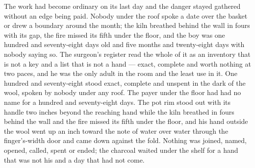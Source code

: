 The work had become ordinary on its last day and the danger stayed gathered without an edge being paid. Nobody under the roof spoke a date over the basket or drew a boundary around the month; the kiln breathed behind the wall in fours with its gap, the fire missed its fifth under the floor, and the boy was one hundred and seventy-eight days old and five months and twenty-eight days with nobody saying so. The surgeon's register read the whole of it as an inventory that is not a key and a list that is not a hand --- exact, complete and worth nothing at two paces, and he was the only adult in the room and the least use in it. One hundred and seventy-eight stood exact, complete and unspent in the dark of the wool, spoken by nobody under any roof. The payer under the floor had had no name for a hundred and seventy-eight days. The pot rim stood out with its handle two inches beyond the reaching hand while the kiln breathed in fours behind the wall and the fire missed its fifth under the floor, and his hand outside the wool went up an inch toward the note of water over water through the finger's-width door and came down against the fold. Nothing was joined, named, opened, called, spent or ended; the charcoal waited under the shelf for a hand that was not his and a day that had not come.
